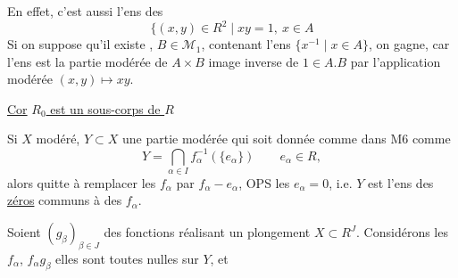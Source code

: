 
En effet, c'est aussi l'ens des
\[
\{(x,y)\in R^2\mid xy=1,\ x\in A
\]
Si on suppose qu'il existe , $B\in\mathcal M_1$, contenant l'ens  $\{x^{-1}\mid x\in A\}$, on gagne, car l'ens est la partie modérée de $A\times B$ image inverse de $1\in A.B$  par l'application modérée $(x,y)\mapsto xy$.

\uline{Cor} \uline{$R_0$ est un sous-corps de $R$}


Si $X$ modéré, $Y\subset X$ une partie modérée qui soit donnée comme dans M6 comme
\[
Y=\bigcap_{\alpha\in I} f_\alpha^{-1}(\{e_\alpha\})\qquad e_\alpha\in R,
\]
alors quitte à remplacer les $f_\alpha$ par $f_\alpha-e_\alpha$, OPS les $e_\alpha=0$, i.e. $Y$ est l'ens des \uline{zéros} communs à des $f_\alpha$.

Soient $(g_\beta)_{\beta\in J}$  des fonctions  réalisant un plongement $X\subset R^J$. Considérons les $f_\alpha$, $f_\alpha g_\beta$  elles sont toutes nulles sur $Y$, et

